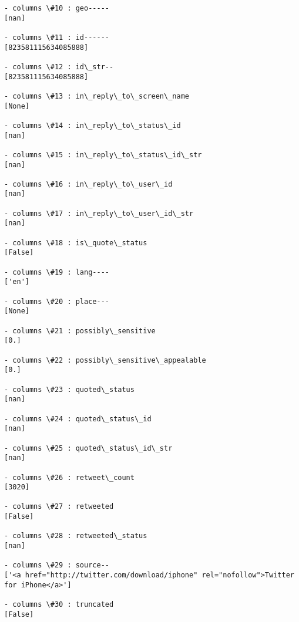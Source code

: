 \documentclass[11pt]{article}
\begin{document}
\begin{Verbatim}[commandchars=\\\{\}]
- columns \#10 : geo-----
[nan]

- columns \#11 : id------
[823581115634085888]

- columns \#12 : id\_str--
[823581115634085888]

- columns \#13 : in\_reply\_to\_screen\_name
[None]

- columns \#14 : in\_reply\_to\_status\_id
[nan]

- columns \#15 : in\_reply\_to\_status\_id\_str
[nan]

- columns \#16 : in\_reply\_to\_user\_id
[nan]

- columns \#17 : in\_reply\_to\_user\_id\_str
[nan]

- columns \#18 : is\_quote\_status
[False]

- columns \#19 : lang----
['en']

- columns \#20 : place---
[None]

- columns \#21 : possibly\_sensitive
[0.]

- columns \#22 : possibly\_sensitive\_appealable
[0.]

- columns \#23 : quoted\_status
[nan]

- columns \#24 : quoted\_status\_id
[nan]

- columns \#25 : quoted\_status\_id\_str
[nan]

- columns \#26 : retweet\_count
[3020]

- columns \#27 : retweeted
[False]

- columns \#28 : retweeted\_status
[nan]

- columns \#29 : source--
['<a href="http://twitter.com/download/iphone" rel="nofollow">Twitter for iPhone</a>']

- columns \#30 : truncated
[False]


\end{Verbatim}
\end{document}
